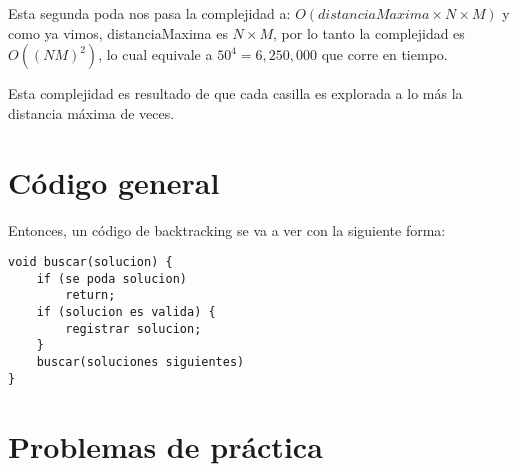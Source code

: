 Esta segunda poda nos pasa la complejidad a: \(O(distanciaMaxima\times N \times M)\) y como ya vimos, distanciaMaxima es \(N\times M\), por lo tanto la complejidad es \(O((NM)^2)\), lo cual equivale a \(50^4=6,250,000\) que corre en tiempo.

Esta complejidad es resultado de que cada casilla es explorada a lo más la distancia máxima de veces.
\pagebreak
\section{Código general}

Entonces, un código de backtracking se va a ver con la siguiente forma:
\begin{lstlisting}
void buscar(solucion) {
	if (se poda solucion)
		return;
	if (solucion es valida) {
		registrar solucion;
	}
	buscar(soluciones siguientes)
}
\end{lstlisting}

\section*{Problemas de práctica}

\begin{exercise}
\end{exercise}

\begin{exercise}
\end{exercise}